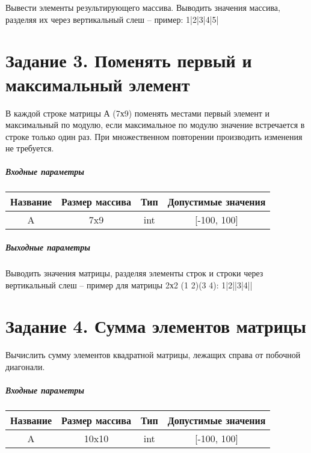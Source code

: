Вывести элементы результирующего массива. Выводить значения массива, разделяя их через вертикальный слеш -- пример: 1|2|3|4|5|
\\
\chapter*{Задание 3. Поменять первый и максимальный элемент}

В каждой строке матрицы А (7х9) поменять местами первый элемент и максимальный по модулю, если максимальное по модулю значение встречается в строке только один раз. При множественном повторении производить изменения не требуется. 

\paragraph{Входные параметры}

\begin{tabular}{ |c|c|c|c| }
\hline
Название & Размер массива & Тип & Допустимые значения \\ 
 \hline
A & 7x9 & int & [-100, 100] \\ 
 \hline

\end{tabular}


\paragraph{Выходные параметры}

Выводить значения матрицы, разделяя элементы строк и строки через вертикальный слеш -- пример для матрицы 2х2 (1 2)(3 4): 1|2||3|4||
\\
\chapter*{Задание 4. Сумма элементов матрицы}

Вычислить сумму элементов квадратной матрицы, лежащих справа от побочной диагонали.

\paragraph{Входные параметры}

\begin{tabular}{ |c|c|c|c| }
\hline
Название & Размер массива & Тип & Допустимые значения \\ 
 \hline
A & 10x10 & int & [-100, 100] \\ 
 \hline

\end{tabular}


